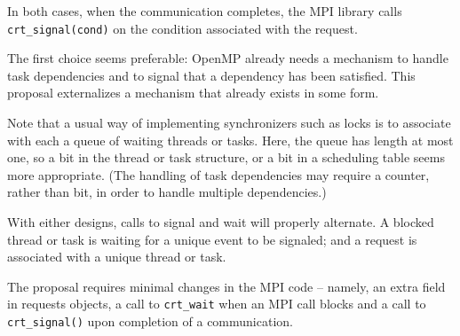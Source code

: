 In both cases, when the communication completes, the MPI library calls 
\texttt{crt\_signal(cond)} on the condition associated with the request.

The first choice seems preferable: OpenMP already needs a mechanism to handle 
task dependencies and to signal that a dependency has been satisfied. This 
proposal externalizes a mechanism that already exists in some form. 
 
Note that a usual way of implementing synchronizers such as locks is to 
associate with each a queue of waiting threads or tasks. Here, the queue has 
length at most one, so a bit in the thread or task structure, or a bit in a 
scheduling table seems more appropriate. (The handling of task dependencies may 
require a counter, rather than bit, in order to handle multiple dependencies.) 

With either designs, calls to signal 
and wait will properly alternate. A blocked thread or task is waiting for a 
unique event to be signaled; and a request is associated with a unique thread 
or task.

The proposal requires minimal changes in the MPI code -- namely, an extra field 
in requests objects, a call to \texttt{crt\_wait} when an MPI call blocks and a 
call to \texttt{crt\_signal()} upon completion of a 
communication.

